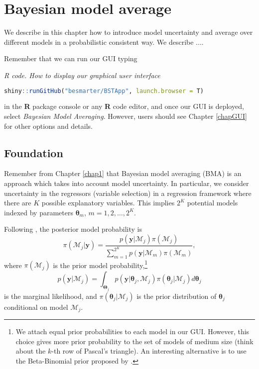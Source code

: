 \chapter{Bayesian model average}\label{chap10}

We describe in this chapter how to introduce model uncertainty and average over different models in a probabilistic consistent way. We describe .... 

Remember that we can run our GUI typing

\begin{tcolorbox}[enhanced,width=4.67in,center upper,
	fontupper=\large\bfseries,drop shadow southwest,sharp corners]
	\textit{R code. How to display our graphical user interface}
	\begin{VF}
		\begin{lstlisting}[language=R]
	shiny::runGitHub("besmarter/BSTApp", launch.browser = T)\end{lstlisting}
	\end{VF}
\end{tcolorbox} 

in the \textbf{R} package console or any \textbf{R} code editor, and once our GUI is deployed, select \textit{Bayesian Model Averaging}. However, users should see Chapter \ref{chapGUI} for other options and details.

\section{Foundation}\label{sec10_1}
Remember from Chapter \ref{chap1} that Bayesian model averaging (BMA) is an approach which takes into account model uncertainty. In particular, we consider uncertainty in the regressors (variable selection) in a regression framework where there are $K$ possible explanatory variables. This implies $2^K$ potential models indexed by parameters $\bm{\theta}_m$, $m=1,2,\dots,2^K$.

Following \cite{Simmons2010}, the posterior model probability is
\begin{equation*}
	\pi(\mathcal{M}_j |\bm{y})=\frac{p(\bm{y} | \mathcal{M}_j)\pi(\mathcal{M}_j)}{\sum_{m=1}^{2^K}p(\bm{y} | \mathcal{M}_m)\pi(\mathcal{M}_m)},
\end{equation*}
where $\pi(\mathcal{M}_j)$ is the prior model probability,\footnote{We attach equal prior probabilities to each model in our GUI. However, this choice gives more prior probability to the set of models of medium size (think about the $k$-th row of Pascal's triangle). An interesting alternative is to use the Beta-Binomial prior proposed by \cite{ley2009effect}.} 
\begin{equation*}
	p(\bm{y} | \mathcal{M}_j)=\int_{\bm{\Theta}_j} p(\bm{y}| \bm{\theta}_j,\mathcal{M}_j)\pi(\bm{\theta}_j | \mathcal{M}_j) d\bm{\theta}_{j}
\end{equation*}
is the marginal likelihood, and $\pi(\bm{\theta}_j | \mathcal{M}_j)$ is the prior distribution of $\bm{\theta}_j$ conditional on model $\mathcal{M}_j$.

